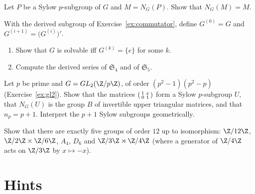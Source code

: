 \begin{exercise}[$\star\star$]\label{ex:normalizer}
Let $P$ be a Sylow $p$-subgroup of $G$ and $M=N_G(P)$. Show that $N_G(M)=M$.
\end{exercise}

\begin{exercise}[$\star\star$]\label{ex:derived}
With the derived subgroup of Exercise~\ref{ex:commutator}, define $G^{(0)}=G$ and $G^{(i+1)}=\bigl(G^{(i)}\bigr)'$.
\begin{enumerate}[label=(\alph*)]
\item Show that $G$ is solvable iff $G^{(k)}=\{e\}$ for some $k$.
\item Compute the derived series of $\mathfrak S_4$ and of $\mathfrak S_5$.
\end{enumerate}
\end{exercise}

\begin{exercise}[$\star\star$]\label{ex:sylowGL2}
Let $p$ be prime and $G=GL_2(\Z/p\Z)$, of order $(p^2-1)(p^2-p)$ (Exercise~\ref{ex:gl2}). Show that the matrices $\begin{psmallmatrix}1&x\\0&1\end{psmallmatrix}$ form a Sylow $p$-subgroup $U$, that $N_G(U)$ is the group $B$ of invertible upper triangular matrices, and that $n_p=p+1$. Interpret the $p+1$ Sylow subgroups geometrically.
\end{exercise}

\begin{exercise}[$\star\star\star$]\label{ex:order12}
Show that there are exactly five groups of order $12$ up to isomorphism: $\Z/12\Z$, $\Z/2\Z\times\Z/6\Z$, $A_4$, $D_6$ and $\Z/3\Z\rtimes\Z/4\Z$ (where a generator of $\Z/4\Z$ acts on $\Z/3\Z$ by $x\mapsto-x$).
\end{exercise}

\section{Hints}

